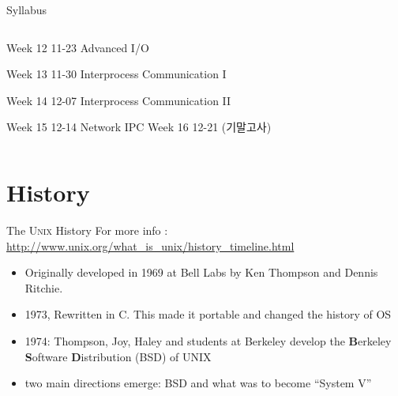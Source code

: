 \documentclass[newPxFont,sthlmFooter,nooffset]{beamer}
\begin{document}
\begin{frame}[t]{Syllabus}
\begin{columns}
\begin{column}{.48\linewidth}
Week 12 11-23 Advanced I/O

\hangindent=1cm
Week 13 11-30 Interprocess Communication I

\hangindent=1cm
Week 14 12-07 Interprocess Communication II

Week 15 12-14 Network IPC
Week 16 12-21 (기말고사)
\end{column}
\end{columns}
\end{frame}



\section{History}
\begin{frame}[t]{The \textsc{Unix} History}
For more info :
\url{http://www.unix.org/what_is_unix/history_timeline.html}
\bigskip
\begin{itemize}
	\item Originally developed in 1969 at Bell Labs by Ken Thompson
		and Dennis Ritchie.
	\item 1973, Rewritten in C. This made it portable and changed the history of OS
	\item 1974: Thompson, Joy, Haley and students at Berkeley develop
		the {\bf B}erkeley {\bf S}oftware {\bf D}istribution (BSD) of UNIX
	\item two main directions emerge: BSD and what was to become ``System V''
\end{itemize}
\end{frame}
\end{document}
